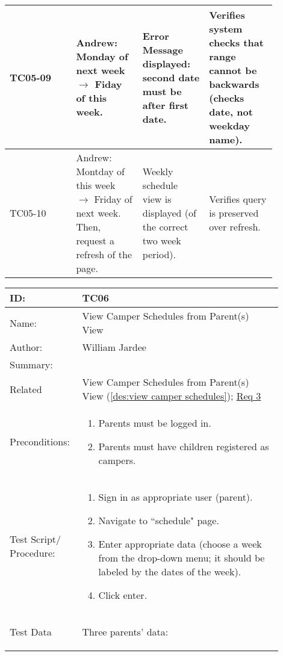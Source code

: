 \documentclass[11pt]{article}
\begin{document}
\begin{center}
\begin{longtable}{|p{0.22\linewidth}|p{0.22\linewidth}|p{0.22\linewidth}|p{0.22\linewidth}|}
	TC05-09 & Andrew: Monday of next week $\longrightarrow$ Fiday of this week. & Error Message displayed: second date must be after first date. & Verifies system checks that range cannot be backwards (checks date, not weekday name).\vspace*{1em}\\\hline
	TC05-10 & Andrew: Montday of this week $\longrightarrow$ Friday of next week. Then, request a refresh of the page. & Weekly schedule view is displayed (of the correct two week period). & Verifies query is preserved over refresh.\vspace*{1em}\\\hline
\end{longtable}
\end{center}
\clearpage


\begin{table}[H]
\begin{center}
\begin{tabular}{p{0.20\linewidth}p{0.70\linewidth}}
	ID: & TC06\\\hline
	Name: & View Camper Schedules from Parent(s) View \\\hline
	Author: & William Jardee\\\hline
	Summary: &  \\\hline
	Related \hspace{5em} & View Camper Schedules from Parent(s) View (\cref{des:view camper schedules}); \hyperlink{Req3}{Req 3}\\\hline
	Preconditions:& \begin{enumerate}[topsep=0pt] 
		\item Parents must be logged in.
		\item Parents must have children registered as campers.
	\end{enumerate}\\\hline
	Test Script/ Procedure: & \begin{enumerate}[topsep=0pt]
		\item Sign in as appropriate user (parent).
		\item Navigate to ``schedule" page.
		\item Enter appropriate data (choose a week from the drop-down menu; it should be labeled by the dates of the week).
		\item Click enter.
	\end{enumerate}\\\hline
	Test Data & \vspace*{.25em} Three parents' data:
	\begin{itemize}[topsep=0pt]

\end{itemize}
\end{tabular}
\end{center}
\end{table}
\end{document}
